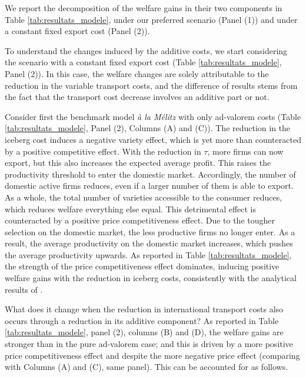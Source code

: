 \documentclass[a4paper,11pt]{article}
\begin{document}
We report the decomposition of the welfare gains in their two components in Table \ref{tab:resultats_modele}, under our preferred scenario (Panel (1)) and under a constant fixed export cost (Panel (2)).

To understand the changes induced by the additive costs, we start considering the scenario with a constant fixed export cost (Table  \ref{tab:resultats_modele}, Panel (2)). In this case, the welfare changes are solely attributable to the reduction in the variable transport costs, and the difference of results stems from the fact that the transport cost decrease involves an additive part or not.

Consider first the benchmark model \textit{\`{a} la M\'{e}litz} with only ad-valorem costs (Table \ref{tab:resultats_modele}, Panel (2), Columns (A) and (C)). The reduction in the iceberg cost induces a negative variety effect, which is yet
more than counteracted by a positive competitive effect. With the reduction in $\tau$, more firms can now export, but this also increases
the expected average profit. This raises the productivity threshold to enter the domestic
market. Accordingly, the number of domestic active firms reduces, even if a larger number
of them is able to export. As a whole, the total number of varieties accessible to the
consumer reduces, which reduces welfare everything else equal.
This detrimental effect is counteracted by a positive price competitiveness effect. Due
to the tougher selection on the domestic market, the less productive firms no longer enter.
As a result, the average productivity on the domestic market increases, which pushes
the average productivity upwards. As reported in Table \ref{tab:resultats_modele}, the strength of the price
competitiveness effect dominates, inducing positive welfare gains with the reduction in
iceberg costs, consistently with the analytical results of \cite{melitz}.

What does it change when the reduction in international transport costs also occurs
through a reduction in its additive component? As reported in Table \ref{tab:resultats_modele}, panel (2), columns (B) and (D), the welfare gains are stronger than in the pure ad-valorem case; and this is driven by a more positive price competitiveness effect and despite the more negative price effect (comparing with Columns (A) and (C), same panel). This can be accounted for as follows.
\end{document}
